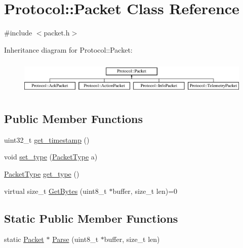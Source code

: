 \hypertarget{class_protocol_1_1_packet}{}\section{Protocol\+:\+:Packet Class Reference}
\label{class_protocol_1_1_packet}


{\ttfamily \#include $<$packet.\+h$>$}

Inheritance diagram for Protocol\+:\+:Packet\+:\begin{figure}[H]
\begin{center}
\leavevmode
\includegraphics[height=1.686747cm]{class_protocol_1_1_packet}
\end{center}
\end{figure}
\subsection*{Public Member Functions}
\begin{DoxyCompactItemize}
\item 
uint32\+\_\+t \hyperlink{class_protocol_1_1_packet_acbe4f1b9f973d14097814d16fb0cd83a}{get\+\_\+timestamp} ()
\item 
void \hyperlink{class_protocol_1_1_packet_aa3f97852d443bb9554178384afa24eec}{set\+\_\+type} (\hyperlink{namespace_protocol_a0704fe3e36f425dc9805a6dcc1ea1b75}{Packet\+Type} a)
\item 
\hyperlink{namespace_protocol_a0704fe3e36f425dc9805a6dcc1ea1b75}{Packet\+Type} \hyperlink{class_protocol_1_1_packet_a3c159ff945d95102ee2a2ba0b93d05d8}{get\+\_\+type} ()
\item 
virtual size\+\_\+t \hyperlink{class_protocol_1_1_packet_a9c89c3d05acc44a5050ebfc756a2cd41}{Get\+Bytes} (uint8\+\_\+t $\ast$buffer, size\+\_\+t len)=0
\end{DoxyCompactItemize}
\subsection*{Static Public Member Functions}
\begin{DoxyCompactItemize}
\item 
static \hyperlink{class_protocol_1_1_packet}{Packet} $\ast$ \hyperlink{class_protocol_1_1_packet_ad327686418aa271121e6a6a8eadebbd4}{Parse} (uint8\+\_\+t $\ast$buffer, size\+\_\+t len)
\end{DoxyCompactItemize}
